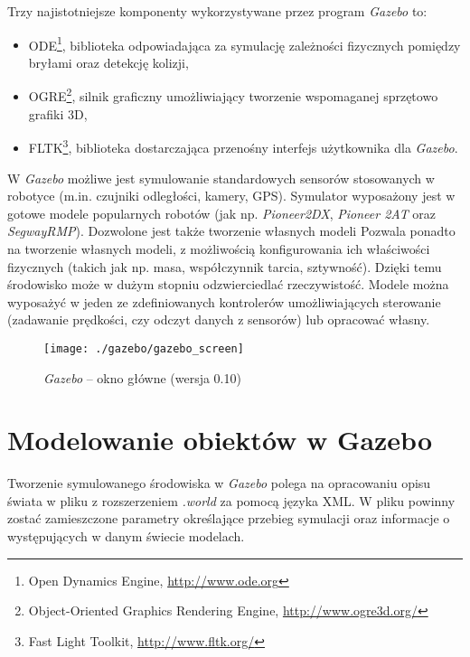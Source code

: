  	Trzy najistotniejsze komponenty wykorzystywane przez program \textit{Gazebo} to:
 	\begin{itemize}
 	 \item ODE\footnote{Open Dynamics Engine, \url{http://www.ode.org}}, biblioteka  odpowiadająca za symulację
 	 	zależności fizycznych pomiędzy bryłami oraz detekcję kolizji,
 	 \item OGRE\footnote{Object-Oriented Graphics Rendering Engine, \url{http://www.ogre3d.org/}}, 
		silnik graficzny umożliwiający tworzenie wspomaganej sprzętowo grafiki 3D,
 	 \item FLTK\footnote{Fast Light Toolkit, \url{http://www.fltk.org/}}, biblioteka dostarczająca 
		przenośny interfejs użytkownika dla \textit{Gazebo}.
 	\end{itemize}

	W \textit{Gazebo} możliwe jest symulowanie standardowych sensorów stosowanych w robotyce (m.in. czujniki odległości, kamery, GPS). Symulator wyposażony jest w gotowe modele 
	popularnych robotów (jak np. \textit{Pioneer2DX}, \textit{Pioneer 2AT} oraz \textit{SegwayRMP}).
	Dozwolone jest także tworzenie własnych modeli
	Pozwala ponadto na tworzenie własnych modeli, z możliwością konfigurowania ich właściwości fizycznych (takich jak np. masa, współczynnik tarcia, sztywność).
	Dzięki temu środowisko może w dużym stopniu odzwierciedlać rzeczywistość. Modele można wyposażyć w jeden ze zdefiniowanych kontrolerów umożliwiających sterowanie (zadawanie prędkości, 
	czy odczyt danych z sensorów) lub opracować własny.
	\begin{figure}[!t]
	\centering
	\label{fig:gazebo}
	\texttt{[image: ./gazebo/gazebo\_screen]}
	\caption{\textit{Gazebo} -- okno główne (wersja 0.10)}
	\end{figure}

	\section{Modelowanie obiektów w Gazebo}
	Tworzenie symulowanego środowiska w \textit{Gazebo} polega na opracowaniu opisu świata w pliku z rozszerzeniem \textit{.world} za pomocą języka XML. W pliku powinny zostać zamieszczone parametry
	określające przebieg symulacji oraz informacje o występujących w danym świecie modelach.
	
